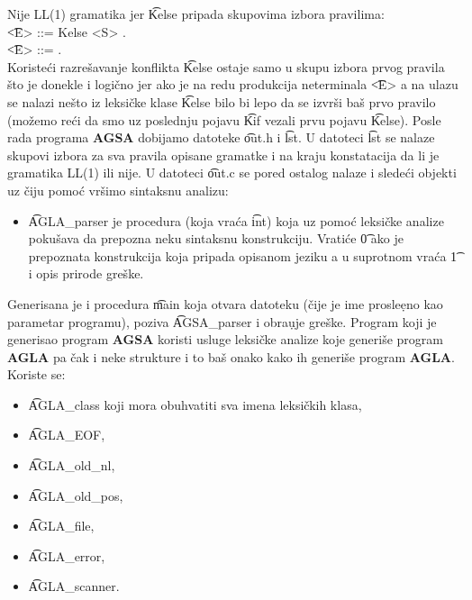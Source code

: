       Nije LL(1) gramatika jer \t{Kelse} pripada skupovima izbora
      pravilima:\\
      \hs\t{<E> ::= Kelse <S> .}\\
      \hs\t{<E> ::= .}\\
      Koriste\'ci razre\v savanje konflikta \t{Kelse} ostaje samo u skupu
      izbora prvog pravila \v sto je donekle i logi\v cno jer ako je na
      redu produkcija neterminala \t{<E>} a na ulazu se nalazi ne\v sto iz
      leksi\v cke klase \t{Kelse} bilo bi lepo da se izvr\v si ba\v s
      prvo pravilo (mo\v zemo re\'ci da smo uz poslednju pojavu \t{Kif}
      vezali prvu pojavu \t{Kelse}).
%
%
      Posle rada programa {\bf AGSA} dobijamo datoteke \t{out.h} i \t{lst}.
      U datoteci \t{lst} se nalaze skupovi izbora za sva pravila opisane
      gramatke i na kraju konstatacija da li je gramatika LL(1) ili nije.
      U datoteci \t{out.c} se pored ostalog nalaze i slede\'ci objekti uz
      \v ciju pomo\'c vr\v simo sintaksnu analizu:
      \begin{itemize}
        \item
        {
          \t{AGLA\_parser} je procedura (koja vra\'ca \t{int}) koja uz
          pomo\'c leksi\v cke analize poku\v sava da prepozna neku
          sintaksnu konstrukciju.
          Vrati\'ce \t{0} ako je prepoznata konstrukcija koja pripada
          opisanom jeziku a u suprotnom vra\'ca \t{1} i opis prirode
          gre\v ske.
        }
      \end{itemize}
      Generisana je i procedura \t{main} koja otvara datoteku (\v cije je
      ime prosle\d eno kao parametar programu), poziva \t{AGSA\_parser} i
      obra\d uje gre\v ske.
      Program koji je generisao program {\bf AGSA} koristi usluge
      leksi\v cke analize koje generi\v se program {\bf AGLA} pa \v cak
      i neke strukture i to ba\v s onako kako ih generi\v se program
      {\bf AGLA}.\\
      Koriste se:
      \begin{itemize}
        \item
        {
          \t{AGLA\_class} koji mora obuhvatiti sva imena leksi\v ckih klasa,
        }
        \item
        {
          \t{AGLA\_EOF},
        }
        \item
        {
          \t{AGLA\_old\_nl},
        }
        \item
        {
          \t{AGLA\_old\_pos},
        }
        \item
        {
          \t{AGLA\_file},
        }
        \item
        {
          \t{AGLA\_error},
        }
        \item
        {
          \t{AGLA\_scanner}.
        }
      \end{itemize}
